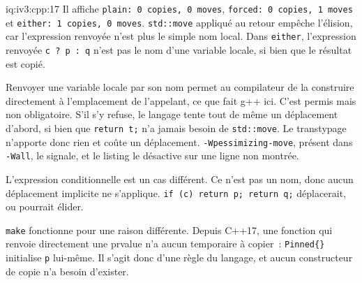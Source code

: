 \begin{solution}{iq:iv3:cpp:17}
Il affiche \texttt{plain: 0 copies, 0 moves}, \texttt{forced: 0 copies, 1 moves} et \texttt{either: 1 copies, 0 moves}. \texttt{std::move} appliqué au retour empêche l'élision, car l'expression renvoyée n'est plus le simple nom local. Dans \texttt{either}, l'expression renvoyée \texttt{c ? p : q} n'est pas le nom d'une variable locale, si bien que le résultat est copié.

Renvoyer une variable locale par son nom permet au compilateur de la construire directement à l'emplacement de l'appelant, ce que fait g++ ici. C'est permis mais non obligatoire. S'il s'y refuse, le langage tente tout de même un déplacement d'abord, si bien que \texttt{return t;} n'a jamais besoin de \texttt{std::move}. Le transtypage n'apporte donc rien et coûte un déplacement. \texttt{-Wpessimizing-move}, présent dans \texttt{-Wall}, le signale, et le listing le désactive sur une ligne non montrée.

L'expression conditionnelle est un cas différent. Ce n'est pas un nom, donc aucun déplacement implicite ne s'applique. \texttt{if (c) return p; return q;} déplacerait, ou pourrait élider.

\texttt{make} fonctionne pour une raison différente. Depuis C++17, une fonction qui renvoie directement une prvalue n'a aucun temporaire à copier~: \texttt{Pinned\{\}} initialise \texttt{p} lui-même. Il s'agit donc d'une règle du langage, et aucun constructeur de copie n'a besoin d'exister.

\end{solution}

